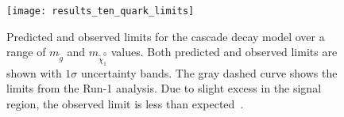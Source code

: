 \begin{figure}[!ht]
    \centering
    \texttt{[image: results\_ten\_quark\_limits]}
    \caption{Predicted and observed limits for the cascade decay model over a range of $m_{\tilde{g}}$ and $m_{\tilde{\chi}_1^0}$ values.
    Both predicted and observed limits are shown with $1\sigma$ uncertainty bands.
    The gray dashed curve shows the limits from the Run-1 analysis.
    Due to slight excess in the signal region, the observed limit is less than expected~\cite{paper-plb}.}
\label{fig:results_ten_quark_limits}
\end{figure}
